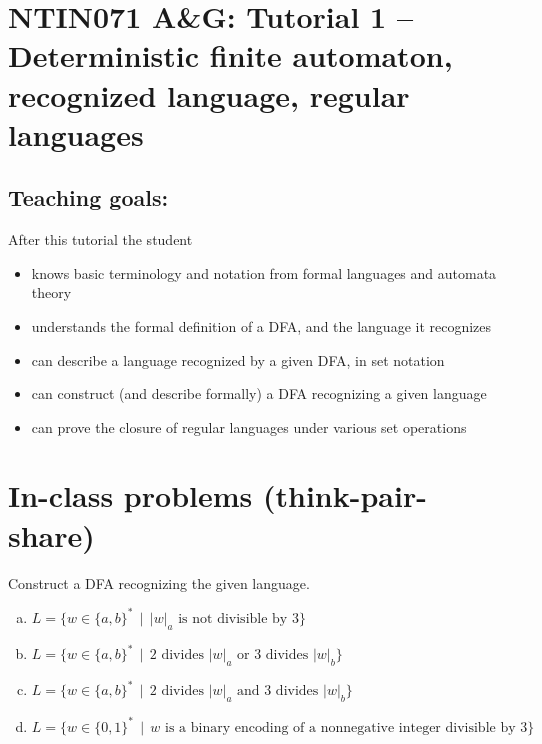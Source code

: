 \documentclass[a4paper,12pt]{amsart}
\begin{document}
\thispagestyle{empty}

\section*{NTIN071 A\&G: Tutorial 1 -- Deterministic finite automaton, recognized language, regular languages}

\medskip

\subsection*{Teaching goals:} After this tutorial the student

    \begin{itemize}\setlength{\itemsep}{0pt}
        \item knows basic terminology and notation from formal languages and automata theory
        \item understands the formal definition of a DFA, and the language it recognizes
        \item can describe a language recognized by a given DFA, in set notation
        \item can construct (and describe formally) a DFA recognizing a given language
        \item can prove the closure of regular languages under various set operations
    \end{itemize}


\section*{In-class problems (think-pair-share)}

\medskip

\medskip\begin{problem} 
    
    Construct a DFA recognizing the given language.

    \medskip
    
    \begin{enumerate}[(a)]\setlength\itemsep{6pt}        
        \item $L=\{w\in\{a,b\}^* \,\mid\, |w|_a \text{ is not divisible by 3}\}$
        \item $L=\{w\in\{a,b\}^* \,\mid\,\text{2 divides $|w|_a$ or 3 divides $|w|_b$}\}$ 
        \item $L=\{w\in\{a,b\}^* \,\mid\, \text{2 divides $|w|_a$ and 3 divides $|w|_b$}\}$
        \item $L=\{w\in\{0,1\}^* \,\mid\, w\text{ is a binary encoding of a nonnegative integer divisible by 3}\}$        
    \end{enumerate}

\end{problem}
\end{document}
